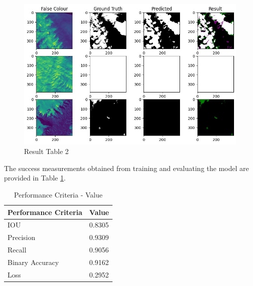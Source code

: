 \begin{figure}[htp]
    \centering
    \includegraphics[width=15cm]{projectChapters/images/result3.png}
    \caption{Result Table 2}
    \label{res3}
\end{figure}
\newpage
The success measurements obtained from training and evaluating the model are provided in Table \ref{resultTable}.
\hfill \break
\begin{table}[htp]
    \centering
    \begin{tabular}{ |p{6cm}||p{2cm}|}
     \hline
     \hline
     Performance Criteria & Value\\
     \hline
     \hline
     IOU     &   0.8305\\
     \hline
     Precision   &     0.9309\\
     \hline
     Recall  &  0.9056\\
     \hline
     Binary Accuracy       &     0.9162\\
     \hline
     Loss &   0.2952\\
     \hline
    \end{tabular}

    \caption{Performance Criteria - Value}
    \label{resultTable}
\end{table}

